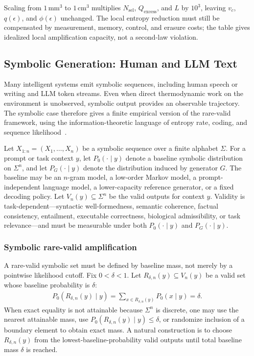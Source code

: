 \documentclass[
  aps,
  prresearch,
  reprint,
  amsmath,
  amssymb,
  superscriptaddress,
  nofootinbib,
  longbibliography
]{revtex4-2}
\def\EQSP{3pt}
\newcommand{\cgather}[2][\EQSP]{\begingroup\setlength\abovedisplayskip{#1}\setlength\belowdisplayskip{#1}\begin{gather} #2 \end{gather}\endgroup\noindent}
\begin{document}
Scaling from \(1\,\mathrm{mm}^3\) to \(1\,\mathrm{cm}^3\) multiplies \(N_{\mathrm{sel}}\), \(Q_{\mathrm{excess}}\), and \(L\) by \(10^3\), leaving \(v_c\), \(q(\epsilon)\), and \(\phi(\epsilon)\) unchanged. The local entropy reduction must still be compensated by measurement, memory, control, and erasure costs; the table gives idealized local amplification capacity, not a second-law violation.


\subsection{Symbolic Generation: Human and LLM Text}
\label{sec:symbolic}

Many intelligent systems emit symbolic sequences, including human speech or writing and LLM token streams. Even when direct thermodynamic work on the environment is unobserved, symbolic output provides an observable trajectory. The symbolic case therefore gives a finite empirical version of the rare-valid framework, using the information-theoretic language of entropy rate, coding, and sequence likelihood~\citep{shannon1948mathematical,coverthomas2006elements}.

Let \(X_{1:n}=(X_1,\ldots,X_n)\) be a symbolic sequence over a finite alphabet \(\Sigma\). For a prompt or task context \(y\), let \(P_0(\cdot\mid y)\) denote a baseline symbolic distribution on \(\Sigma^n\), and let \(P_G(\cdot\mid y)\) denote the distribution induced by generator \(G\). The baseline may be an \(n\)-gram model, a low-order Markov model, a prompt-independent language model, a lower-capacity reference generator, or a fixed decoding policy. Let \(V_n(y)\subseteq\Sigma^n\) be the valid outputs for context \(y\). Validity is task-dependent---syntactic well-formedness, semantic coherence, factual consistency, entailment, executable correctness, biological admissibility, or task relevance---and must be measurable under both \(P_0(\cdot\mid y)\) and \(P_G(\cdot\mid y)\).

\subsubsection{Symbolic rare-valid amplification}

A rare-valid symbolic set must be defined by baseline mass, not merely by a pointwise likelihood cutoff. Fix \(0<\delta<1\). Let \(R_{\delta,n}(y)\subseteq V_n(y)\) be a valid set whose baseline probability is \(\delta\):
\cgather{
    P_0(R_{\delta,n}(y)\mid y)
    =
    \sum_{x\in R_{\delta,n}(y)}P_0(x\mid y)
    =
    \delta.
    \label{eq:sym_rare_mass}
}
When exact equality is not attainable because \(\Sigma^n\) is discrete, one may use the nearest attainable mass, use \(P_0(R_{\delta,n}(y)\mid y)\leq \delta\), or randomize inclusion of a boundary element to obtain exact mass. A natural construction is to choose \(R_{\delta,n}(y)\) from the lowest-baseline-probability valid outputs until total baseline mass \(\delta\) is reached.
\end{document}
